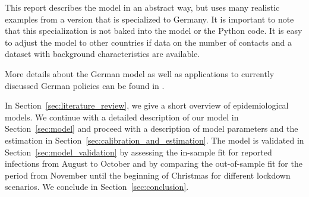 
This report describes the model in an abstract way, but uses many realistic examples
from a version that is specialized to Germany. It is important to note that this
specialization is not baked into the model or the Python code. It is easy to adjust the
model to other countries if data on the number of contacts and a dataset with background
characteristics are available.

More details about the German model as well as applications to currently discussed
German policies can be found in \citet{Dorn2020a}.

In Section~\ref{sec:literature_review}, we give a short overview of epidemiological
models. We continue with a detailed description of our model in Section~\ref{sec:model}
and proceed with a description of model parameters and the estimation in
Section~\ref{sec:calibration_and_estimation}. The model is validated in
Section~\ref{sec:model_validation} by assessing the in-sample fit for reported
infections from August to October and by comparing the out-of-sample fit for the period
from November until the beginning of Christmas for different lockdown scenarios. We
conclude in Section~\ref{sec:conclusion}.
